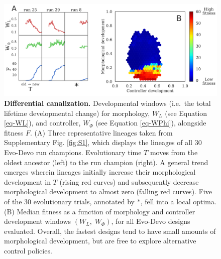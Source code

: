 \begin{figure}[t]
\centering
\includegraphics[width=\linewidth]{Chapter04/Fig4}
\caption{\label{fig-correlation}\textbf{Differential canalization.} 
Developmental windows (i.e.~the total lifetime developmental change) for morphology, $W_L$ (see Equation \ref{eq-WL}), and controller, $W_{\Phi}$ (see Equation \ref{eq-WPhi}), alongside fitness $F$.
(A) Three representative lineages taken from Supplementary Fig. \ref{fig:S1}, %
which displays the lineages of all 30 Evo-Devo run champions. Evolutionary time $T$ moves from the oldest ancestor (left) to the run champion (right). A general trend emerges wherein lineages initially increase their morphological development in $T$ (rising red curves) and subsequently decrease morphological development to almost zero (falling red curves). Five of the 30 evolutionary trials, annotated by {\Large $\ast$}, fell into a local optima.
(B) Median fitness as a function of morphology and controller development windows $(W_L,\; W_{\Phi})$, for all Evo-Devo designs evaluated. 
Overall, the fastest designs tend to have small amounts of morphological development, but are free to explore alternative control policies.}
\end{figure}

